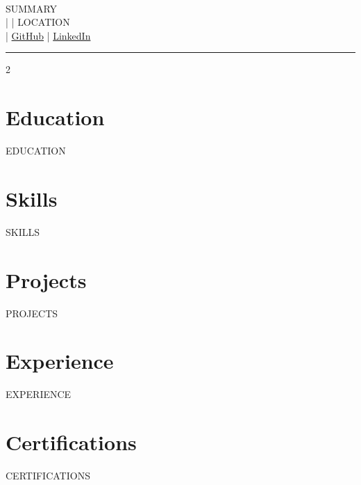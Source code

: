 \documentclass[a4paper, 10pt]{article}
\begin{document}
\begin{center}
    {\Huge \textbf{}} \\
    \vspace{0.1cm}
    {{SUMMARY}} \\
    \href{mailto:{{EMAIL}}}{} | 
    \href{tel:{{PHONE}}}{} |
    {{LOCATION}} \\
    \href{{{PORTFOLIO}}}{} |
    \href{{{GITHUB}}}{\color{accentcolor}GitHub} |
    \href{{{LINKEDIN}}}{\color{accentcolor}LinkedIn}
\end{center}

\vspace{0.3cm}
\hrule
\vspace{-0.4cm}

\titlespacing{\section}{0pt}{10 pt}{9pt}
\begin{multicols}{2}

\section*{Education}
{{EDUCATION}}

\section*{Skills}
{{SKILLS}}

\section*{Projects}
{{PROJECTS}}

\columnbreak

\section*{Experience}
{{EXPERIENCE}}

\section*{Certifications}
{{CERTIFICATIONS}}

\end{multicols}
\end{document}
